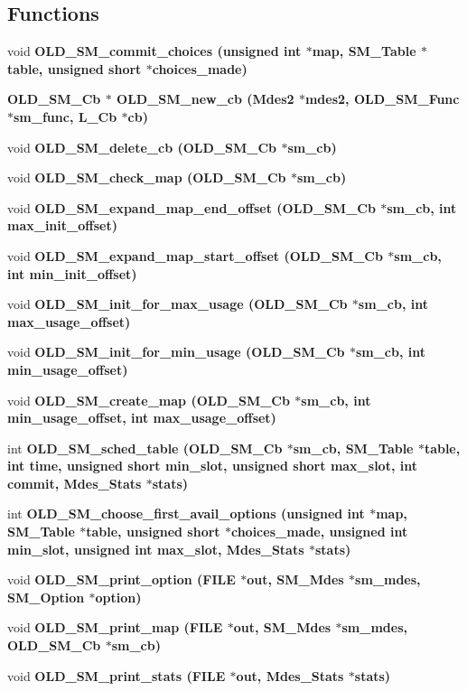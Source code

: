 \subsection*{Functions}
\begin{CompactItemize}
\item 
void \bf{OLD\_\-SM\_\-commit\_\-choices} (unsigned int $\ast$map, SM\_\-Table $\ast$table, unsigned short $\ast$choices\_\-made)
\item 
\bf{OLD\_\-SM\_\-Cb} $\ast$ \bf{OLD\_\-SM\_\-new\_\-cb} (Mdes2 $\ast$mdes2, \bf{OLD\_\-SM\_\-Func} $\ast$sm\_\-func, L\_\-Cb $\ast$cb)
\item 
void \bf{OLD\_\-SM\_\-delete\_\-cb} (\bf{OLD\_\-SM\_\-Cb} $\ast$sm\_\-cb)
\item 
void \bf{OLD\_\-SM\_\-check\_\-map} (\bf{OLD\_\-SM\_\-Cb} $\ast$sm\_\-cb)
\item 
void \bf{OLD\_\-SM\_\-expand\_\-map\_\-end\_\-offset} (\bf{OLD\_\-SM\_\-Cb} $\ast$sm\_\-cb, int max\_\-init\_\-offset)
\item 
void \bf{OLD\_\-SM\_\-expand\_\-map\_\-start\_\-offset} (\bf{OLD\_\-SM\_\-Cb} $\ast$sm\_\-cb, int min\_\-init\_\-offset)
\item 
void \bf{OLD\_\-SM\_\-init\_\-for\_\-max\_\-usage} (\bf{OLD\_\-SM\_\-Cb} $\ast$sm\_\-cb, int max\_\-usage\_\-offset)
\item 
void \bf{OLD\_\-SM\_\-init\_\-for\_\-min\_\-usage} (\bf{OLD\_\-SM\_\-Cb} $\ast$sm\_\-cb, int min\_\-usage\_\-offset)
\item 
void \bf{OLD\_\-SM\_\-create\_\-map} (\bf{OLD\_\-SM\_\-Cb} $\ast$sm\_\-cb, int min\_\-usage\_\-offset, int max\_\-usage\_\-offset)
\item 
int \bf{OLD\_\-SM\_\-sched\_\-table} (\bf{OLD\_\-SM\_\-Cb} $\ast$sm\_\-cb, SM\_\-Table $\ast$table, int time, unsigned short min\_\-slot, unsigned short max\_\-slot, int commit, Mdes\_\-Stats $\ast$stats)
\item 
int \bf{OLD\_\-SM\_\-choose\_\-first\_\-avail\_\-options} (unsigned int $\ast$map, SM\_\-Table $\ast$table, unsigned short $\ast$choices\_\-made, unsigned int min\_\-slot, unsigned int max\_\-slot, Mdes\_\-Stats $\ast$stats)
\item 
void \bf{OLD\_\-SM\_\-print\_\-option} (FILE $\ast$out, SM\_\-Mdes $\ast$sm\_\-mdes, SM\_\-Option $\ast$option)
\item 
void \bf{OLD\_\-SM\_\-print\_\-map} (FILE $\ast$out, SM\_\-Mdes $\ast$sm\_\-mdes, \bf{OLD\_\-SM\_\-Cb} $\ast$sm\_\-cb)
\item 
void \bf{OLD\_\-SM\_\-print\_\-stats} (FILE $\ast$out, Mdes\_\-Stats $\ast$stats)
\end{CompactItemize}
